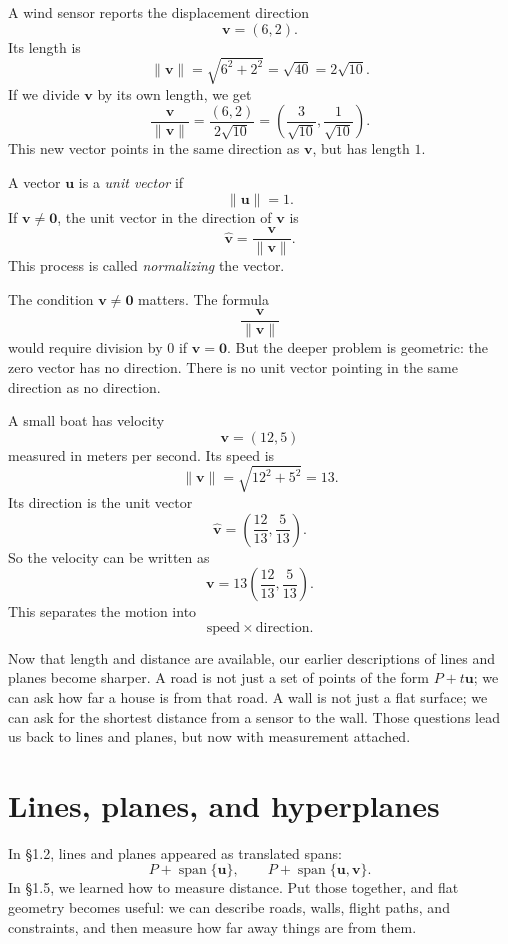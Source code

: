 A wind sensor reports the displacement direction
\[
    \mathbf v=(6,2).
\]
Its length is
\[
    \|\mathbf v\|=\sqrt{6^2+2^2}=\sqrt{40}=2\sqrt{10}.
\]
If we divide \(\mathbf v\) by its own length, we get
\[
    \frac{\mathbf v}{\|\mathbf v\|}
    =
    \frac{(6,2)}{2\sqrt{10}}
    =
    \left(\frac{3}{\sqrt{10}},\frac{1}{\sqrt{10}}\right).
\]
This new vector points in the same direction as \(\mathbf v\), but has length \(1\).

\begin{definition}
A vector \(\mathbf u\) is a \emph{unit vector} if
\[
    \|\mathbf u\|=1.
\]
If \(\mathbf v\neq \mathbf 0\), the unit vector in the direction of \(\mathbf v\) is
\[
    \widehat{\mathbf v}
    =
    \frac{\mathbf v}{\|\mathbf v\|}.
\]
This process is called \emph{normalizing} the vector.
\end{definition}

The condition \(\mathbf v\neq \mathbf 0\) matters.  The formula
\[
    \frac{\mathbf v}{\|\mathbf v\|}
\]
would require division by \(0\) if \(\mathbf v=\mathbf 0\).  But the deeper problem is
geometric: the zero vector has no direction.  There is no unit vector pointing in the
same direction as no direction.

\begin{example}
A small boat has velocity
\[
    \mathbf v=(12,5)
\]
measured in meters per second.  Its speed is
\[
    \|\mathbf v\|=\sqrt{12^2+5^2}=13.
\]
Its direction is the unit vector
\[
    \widehat{\mathbf v}
    =
    \left(\frac{12}{13},\frac{5}{13}\right).
\]
So the velocity can be written as
\[
    \mathbf v
    =
    13\left(\frac{12}{13},\frac{5}{13}\right).
\]
This separates the motion into
\[
    \text{speed}\times\text{direction}.
\]
\end{example}

Now that length and distance are available, our earlier descriptions of lines and planes
become sharper.  A road is not just a set of points of the form \(P+t\mathbf u\); we can
ask how far a house is from that road.  A wall is not just a flat surface; we can ask for
the shortest distance from a sensor to the wall.  Those questions lead us back to lines
and planes, but now with measurement attached.

\section{Lines, planes, and hyperplanes}

In \S1.2, lines and planes appeared as translated spans:
\[
    P+\operatorname{span}\{\mathbf u\},
    \qquad
    P+\operatorname{span}\{\mathbf u,\mathbf v\}.
\]
In \S1.5, we learned how to measure distance.  Put those together, and flat geometry
becomes useful: we can describe roads, walls, flight paths, and constraints, and then
measure how far away things are from them.

